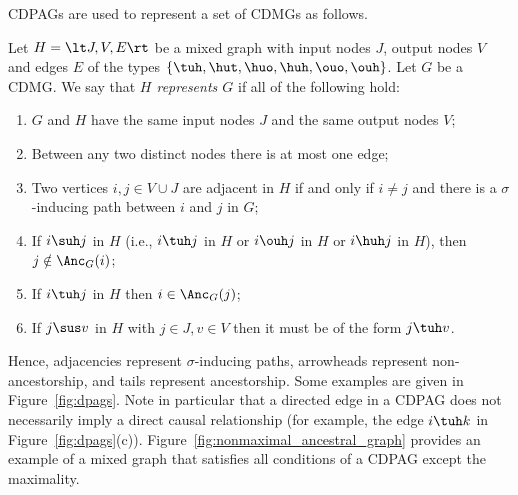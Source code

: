 CDPAGs are used to represent a set of CDMGs as follows.
\begin{Def}\label{def:dpag_represents_dmg}
  Let $H = \lt J,V,E\rt$ be a mixed graph with input nodes $J$, output nodes $V$ and edges $E$ of the types $\{\tuh,\hut,\huo,\huh,\ouo,\ouh\}$.
  Let $G$ be a CDMG.
  We say that \emph{$H$ represents $G$} if all of the following hold:
  \begin{enumerate}
    \item $G$ and $H$ have the same input nodes $J$ and the same output nodes $V$;
    \item Between any two distinct nodes there is at most one edge;
    \item Two vertices $i,j \in V \cup J$ are adjacent in $H$ if and only if $i \ne j$ and there is a $\sigma$-inducing path between $i$ and $j$ in $G$;
    \item If $i \suh j$ in $H$ (i.e., $i \tuh j$ in $H$ or $i \ouh j$ in $H$ or $i \huh j$ in $H$), then $j \notin \Anc_{G}(i)$;
    \item If $i \tuh j$ in $H$ then $i \in \Anc_{G}(j)$;
    \item If $j \sus v$ in $H$ with $j \in J, v \in V$ then it must be of the form $j \tuh v$.
  \end{enumerate}
\end{Def}
Hence, adjacencies represent $\sigma$-inducing paths, arrowheads represent non-ancestorship, and tails represent ancestorship.
Some examples are given in Figure~\ref{fig:dpags}. 
Note in particular that a directed edge in a CDPAG does not necessarily imply a direct causal relationship (for example, the edge $i \tuh k$ in Figure~\ref{fig:dpags}(c)).
Figure~\ref{fig:nonmaximal_ancestral_graph} provides an example of a mixed graph that satisfies all conditions of a CDPAG except the maximality.

